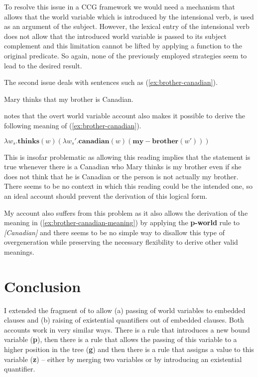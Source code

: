 \documentclass[parskip=half]{scrartcl}
\begin{document}
To resolve this issue in a CCG framework we would need a mechanism that allows that the world variable which is introduced by the intensional verb, is used as an argument of the subject. However, the lexical entry of the intensional verb does not allow that the introduced world variable is passed to its subject complement and this limitation cannot be lifted by applying a function to the original predicate. So again, none of the previously employed strategies seem to lead to the desired result.

The second issue deals with sentences such as (\ref{ex:brother-canadian}).

\begin{exe}
\ex \label{ex:brother-canadian}Mary thinks that my brother is Canadian.
\end{exe}

\cite{percus2000} notes that the  overt world variable account also makes it possible to derive the following meaning of (\ref{ex:brother-canadian}).


\begin{exe}
\ex \label{ex:brother-canadian-meaning} $\lambda w_s. \mathbf{thinks}(w)(\lambda w_s'.  \mathbf{canadian}(w)(\mathbf{my-brother}(w')))$
\end{exe}

This is insofar problematic as allowing this reading implies that the statement is true whenever there is a Canadian who
Mary thinks is my brother even if she does not think that he is Canadian or the person is not actually my brother. There seems to be no 
context in which this reading could be the intended one, so an ideal account should prevent the derivation of this logical form.

My account also suffers from this problem as it also allows the derivation of the meaning in (\ref{ex:brother-canadian-meaning}) by applying the \textbf{p-world} rule to \textit{[Canadian]}  and there seems to be no
simple way to disallow this type of overgeneration while preserving the necessary flexibility to derive other valid meanings. 


\section{Conclusion}

I extended the fragment of \cite{jacobson2014} to allow (a) passing of world variables to embedded clauses and 
(b) raising of existential quantifiers out of embedded clauses. Both accounts work in very similar ways. There is a
rule that introduces a new bound variable (\textbf{p}), then there is a rule that allows the passing of this variable to a higher 
position in the tree (\textbf{g}) and then there is a rule that assigns a value to this variable (\textbf{z}) -- either by merging
two variables or by introducing an existential quantifier.
\end{document}
